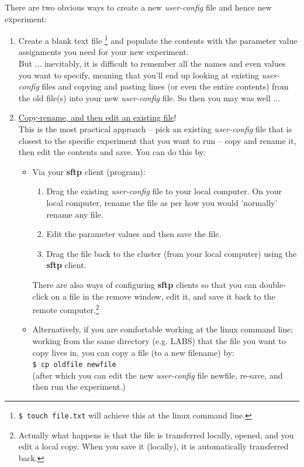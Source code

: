 \vspace{1mm}
There are two obvious ways to create a new \textit{user-config} file and hence new experiment:

\begin{enumerate}[noitemsep]

\vspace{1mm}
\item Create a blank text file \footnote{\texttt{\$ touch file.txt} will achieve this at the linux command line.} and populate the contents with the parameter value assignments you need for your new experiment.
\\But ... inevitably, it is difficult to remember all the names and even values you want to specify, meaning that you'll end up looking at existing \textit{user-config} files and copying and pasting lines (or even the entire contents) from the old file(s) into your new \textit{user-config} file. So then you may was well ...

\vspace{1mm}
\item \uline{Copy-rename, and then edit an existing file}!
\\This is the most practical approach -- pick an existing \textit{user-config} file that is closest to the specific experiment that you want to run -- copy and rename it, then edit the contents and save. You can do this by:
\begin{itemize}[noitemsep]
\vspace{1mm}
\item Via your \textbf{sftp} client (program):
\begin{enumerate}[noitemsep]
\item Drag the existing \textit{user-config} file to your local computer. On your local computer, rename the file as per how you would 'normally' rename any file. 
\item Edit the parameter values and then save the file.
\item Drag the file back to the cluster (from your local computer) using the \textbf{sftp} client.
\end{enumerate}
There are also ways of configuring \textbf{sftp} clients so that you can double-click on a file in the remove window, edit it, and save it back to the remote computer.\footnote{Actually what happens is that the file is transferred locally, opened, and you edit a local copy. When you save it (locally), it is automatically transferred back.} 
\vspace{1mm}
\item Alternatively, if you are comfortable working at the linux command line; working from the same directory (e.g. \textsf{\footnotesize LABS}) that the file you want to copy lives in, you can copy a file (to a new filename) by:
\\\texttt{\small \$ cp oldfile newfile }
\\(after which you can edit the new \textit{user-config} file \textsf{\footnotesize newfile}, re-save, and then run the experiment.)
\end{itemize}
\vspace{1mm}

\end{enumerate}

